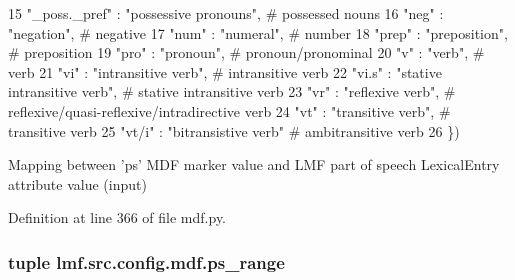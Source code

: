 \begin{DoxyCode}
15     \textcolor{stringliteral}{"\_poss.\_pref"}   : \textcolor{stringliteral}{"possessive pronouns"},        \textcolor{comment}{# possessed nouns}
16     \textcolor{stringliteral}{"neg"}           : \textcolor{stringliteral}{"negation"},                   \textcolor{comment}{# negative}
17     \textcolor{stringliteral}{"num"}           : \textcolor{stringliteral}{"numeral"},                    \textcolor{comment}{# number}
18     \textcolor{stringliteral}{"prep"}          : \textcolor{stringliteral}{"preposition"},                \textcolor{comment}{# preposition}
19     \textcolor{stringliteral}{"pro"}           : \textcolor{stringliteral}{"pronoun"},                    \textcolor{comment}{# pronoun/pronominal}
20     \textcolor{stringliteral}{"v"}             : \textcolor{stringliteral}{"verb"},                       \textcolor{comment}{# verb}
21     \textcolor{stringliteral}{"vi"}            : \textcolor{stringliteral}{"intransitive verb"},          \textcolor{comment}{# intransitive verb}
22     \textcolor{stringliteral}{"vi.s"}          : \textcolor{stringliteral}{"stative intransitive verb"},  \textcolor{comment}{# stative intransitive verb}
23     \textcolor{stringliteral}{"vr"}            : \textcolor{stringliteral}{"reflexive verb"},             \textcolor{comment}{# reflexive/quasi-reflexive/intradirective verb}
24     \textcolor{stringliteral}{"vt"}            : \textcolor{stringliteral}{"transitive verb"},            \textcolor{comment}{# transitive verb}
25     \textcolor{stringliteral}{"vt/i"}          : \textcolor{stringliteral}{"bitransistive verb"}          \textcolor{comment}{# ambitransitive verb}
26 \})
\end{DoxyCode}


Mapping between 'ps' M\+D\+F marker value and L\+M\+F part of speech Lexical\+Entry attribute value (input) 



Definition at line 366 of file mdf.\+py.

\hypertarget{namespacelmf_1_1src_1_1config_1_1mdf_a59bb4fce205d8159bc72c946e3855c4a}{
\subsubsection[{ps\+\_\+range}]{\setlength{\rightskip}{0pt plus 5cm}tuple lmf.\+src.\+config.\+mdf.\+ps\+\_\+range}}\label{namespacelmf_1_1src_1_1config_1_1mdf_a59bb4fce205d8159bc72c946e3855c4a}


